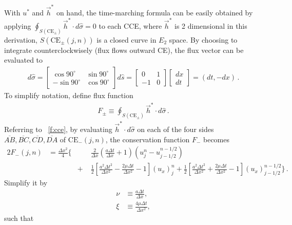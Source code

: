 \documentclass[letterpaper,12pt,dvips]{article}
\numberwithin{equation}{section}
\begin{document}
With $u^*$ and $\vec{h}^*$ on hand, the time-marching formula can be 
easily obtained by applying 
$\oint_{S(\mathrm{CE}_{\pm})}\vec{h}^*\cdot d\hat{\sigma}=0$ to each CCE, 
where $\vec{h}^*$ is 2 dimensional in this derivation, 
$S(\mathrm{CE}_{\pm}(j,n))$ is a closed curve in $E_2$ space.
By choosing to integrate counterclockwisely (flux flows outward CE), the 
flux vector can be evaluated to 
\begin{align*}
  d\hat{\sigma} 
  = \left[\begin{array}{cc} \cos90^{\circ} & \sin90^{\circ} \\ 
                           -\sin90^{\circ} & \cos90^{\circ} 
    \end{array}\right] d\hat{s}
  = \left[\begin{array}{cc} 0 & 1 \\ 
                           -1 & 0 
    \end{array}\right] 
    \left[\begin{array}{c} dx \\ dt 
    \end{array}\right]
  = (dt, -dx) \,.
\end{align*}
To simplify notation, define flux function
\begin{align*}
  F_{\pm} \equiv 
    \oint_{S(\mathrm{CE}_{\pm})}\vec{h}^*\cdot d\hat{\sigma} \,.
\end{align*}
Referring to \figurename~\ref{f:cce}, by evaluating 
$\vec{h}^*\cdot d\hat{\sigma}$ on each of the four sides 
$\overline{AB}, \overline{BC}, \overline{CD}, \overline{DA}$ of 
$\mathrm{CE}_-(j,n)$, the conservation function $F_-$ becomes
\begin{alignat*}{2}
  F_-(j,n) &= \frac{\Delta x^2}{4}\Big\{
    &&\frac{2}{\Delta x}\left(\frac{a\Delta t}{\Delta x}+1\right)
      \left(u_j^n-u_{j-1/2}^{n-1/2}\right) \\
  & &+\;& \frac{1}{2}\left[
          \frac{a^2\Delta t^2}{\Delta x^2} 
        - \frac{2\mu\Delta t} {\Delta x^2} - 1 
        \right](u_x)_j^n
    +     \frac{1}{2}\left[
          \frac{a^2\Delta t^2}{\Delta x^2} 
        + \frac{2\mu\Delta t} {\Delta x^2} - 1 
        \right](u_x)_{j-1/2}^{n-1/2}
    \Big\}\,.
\end{alignat*}
Simplify it by 
\begin{align}
  \nu &\equiv \frac{a\Delta t}{\Delta x}, \label{e:nu} \\
  \xi &\equiv \frac{4\mu\Delta t}{\Delta x^2}, \label{e:xi}
\end{align}
such that 
\end{document}
